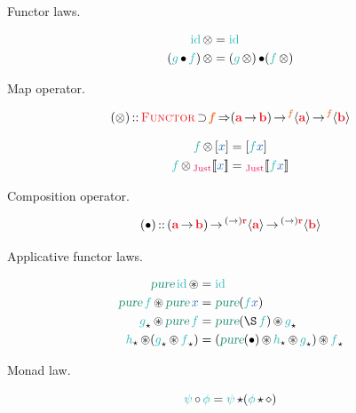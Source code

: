 \documentclass[a5paper,twoside,fleqn,draft]{jsbook}
\begin{document}
Functor laws.

\begin{align}
\hId\hFunctorMap&=\hId\\
(\hFunc{g}\hCompose\hFunc{f})\hFunctorMap&=(\hFunc{g}\hFunctorMap)\hCompose(\hFunc{f}\hFunctorMap)
\end{align}

Map operator.

\begin{equation}
  (\hFunctorMap)\hIsTypeOf\hFunctor\hHasElementsOf\hTypeConstructor{f}\hAndThen
    (\hTypeName{a}\hFunctionArrow\hTypeName{b})\hFunctionArrow\hTypeConstruct{\hTypeConstructor{f}}{\hTypeName{a}}\hFunctionArrow\hTypeConstruct{\hTypeConstructor{f}}{\hTypeName{b}}
\end{equation}

\begin{align}
  \hFunc{f}\hFunctorMap{}\hListWith{\hVar{x}}&=\hListWith{\hFunc{f}\hVar{x}}\\
  \hFunc{f}\hFunctorMap{}\hJustWith{\hVar{x}}&=\hJustWith{\hFunc{f}\hVar{x}}
\end{align}

Composition operator.

\begin{equation}
  (\hCompose)\hIsTypeOf{}(\hTypeName{a}\hFunctionArrow\hTypeName{b})\hFunctionArrow\hTypeConstruct{(\hFunctionArrow)\hTypeName{r}}{\hTypeName{a}}\hFunctionArrow\hTypeConstruct{(\hFunctionArrow)\hTypeName{r}}{\hTypeName{b}}
\end{equation}

Applicative functor laws.

\begin{align}
\hPure\hId\hApplicativeMap&=\hId\\
\hPure\hFunc{f}\hApplicativeMap\hPure\hVar{x}&=\hPure(\hFunc{f}\hVar{x})\\
\hAnyContextDecor{\hFunc{g}}\hApplicativeMap\hPure\hFunc{f}&=\hPure(\hApply\hFunc{f})\hApplicativeMap\hAnyContextDecor{\hFunc{g}}\\
\hAnyContextDecor{\hFunc{h}}\hApplicativeMap(\hAnyContextDecor{\hFunc{g}}\hApplicativeMap\hAnyContextDecor{\hFunc{f}})&=(\hPure(\hCompose)\hApplicativeMap\hAnyContextDecor{\hFunc{h}}\hApplicativeMap\hAnyContextDecor{\hFunc{g}})\hApplicativeMap\hAnyContextDecor{\hFunc{f}}
\end{align}

Monad law.

\begin{equation}
\hFunc{\psi}\hMonadicCompose\hFunc{\phi}=\hFunc{\psi}{}\hMonadicBind(\hFunc{\phi}\hMonadicBind\hAnonParam)
\end{equation}
\end{document}
